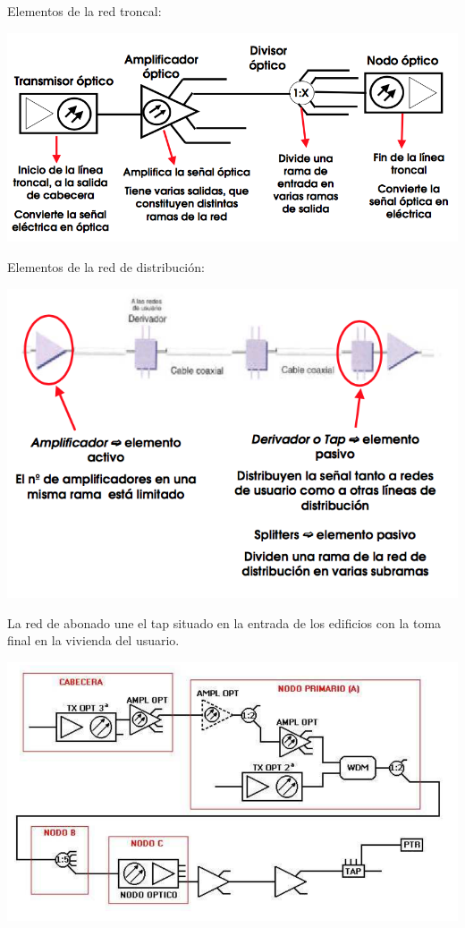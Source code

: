 \documentclass[10pt,portrait, twocolumn]{article}
\begin{document}
Elementos de la red troncal:

	\begin{center}
		\includegraphics[scale=0.2]{images/RedTroncal}
	\end{center}
	
Elementos de la red de distribución:

	\begin{center}
		\includegraphics[scale=0.2]{images/RedDistribucion}
	\end{center}

La red de abonado une el tap situado en la entrada de los edificios con la toma final en la vivienda del usuario.

	\begin{center}
		\includegraphics[scale=0.2]{images/Esquema}
	\end{center}
\end{document}

